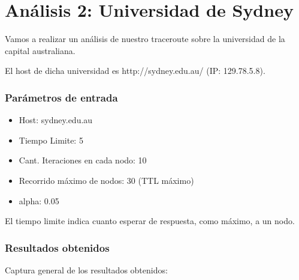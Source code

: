 \section{An\'alisis 2: Universidad de Sydney}
Vamos a realizar un an\'alisis de nuestro traceroute sobre la universidad de la capital australiana.\newline

El host de dicha universidad es http://sydney.edu.au/ (IP: 129.78.5.8).\\	

\subsubsection{Par\'ametros de entrada}
\begin{itemize}
\item Host: sydney.edu.au
\item Tiempo Limite: 5
\item Cant. Iteraciones en cada nodo: 10
\item Recorrido m\'aximo de nodos: 30 (TTL m\'aximo)
\item alpha: 0.05
\end{itemize}
El tiempo limite indica cuanto esperar de respuesta, como m\'aximo, a un nodo.\newline

\subsubsection{Resultados obtenidos}

Captura general de los resultados obtenidos: \newline


